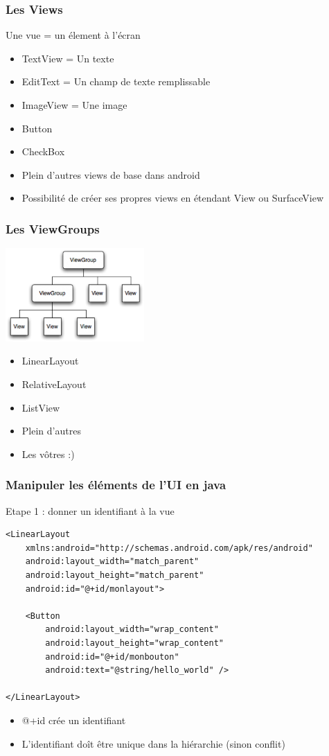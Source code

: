 \documentclass{beamer}
\begin{document}
\begin{frame}[fragile]
\frametitle{Les Views}
   Une vue = un élement à l'écran
  \begin{itemize}
    \item TextView = Un texte
    \item EditText = Un champ de texte remplissable
    \item ImageView = Une image
    \item Button
    \item CheckBox
    \item Plein d'autres views de base dans android
    \item Possibilité de créer ses propres views en étendant View ou SurfaceView
 \end{itemize}
\end{frame}
\begin{frame}[fragile]
\frametitle{Les ViewGroups}
  \includegraphics[width=150pt]{viewgroup.png}
  \begin{itemize}
 \item LinearLayout
 \item RelativeLayout
 \item ListView
 \item Plein d'autres
 \item Les vôtres :)
 \end{itemize}
\end{frame}
\begin{frame}[fragile]
\frametitle{Manipuler les éléments de l'UI en java}
Etape 1 : donner un identifiant à la vue
\begin{lstlisting}
<LinearLayout 
	xmlns:android="http://schemas.android.com/apk/res/android"
    android:layout_width="match_parent"
    android:layout_height="match_parent"
    android:id="@+id/monlayout">

    <Button
        android:layout_width="wrap_content"
        android:layout_height="wrap_content"
        android:id="@+id/monbouton"
        android:text="@string/hello_world" />

</LinearLayout>
\end{lstlisting}
\begin{itemize}
    \item @+id crée un identifiant
    \item L'identifiant doît être unique dans la hiérarchie (sinon conflit)
 \end{itemize}
\end{frame}
\end{document}
